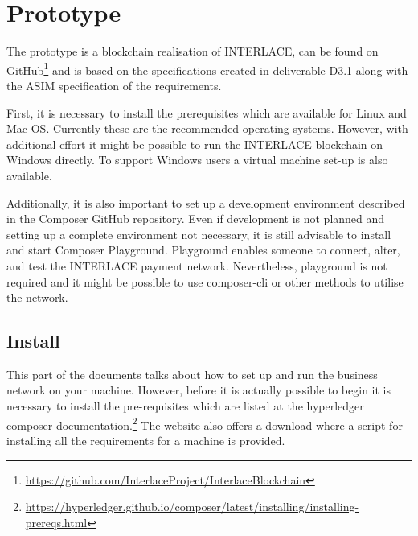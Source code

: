 

\section{Prototype}
\label{sec:prototype}

The prototype is a blockchain realisation of INTERLACE, can be found on GitHub\footnote{\url{https://github.com/InterlaceProject/InterlaceBlockchain}} and is based on the specifications created in deliverable D3.1 \cite{INTERLACE_D31} along with the ASIM specification of the requirements.

First, it is necessary to install the prerequisites which are available for Linux and Mac OS. Currently these are the recommended operating systems. However, with additional effort it might be possible to run the INTERLACE blockchain on Windows directly. To support Windows users a virtual machine set-up is also available.

Additionally, it is also important to set up a development environment described in the Composer GitHub repository. Even if development is not planned and setting up a complete environment not necessary, it is still advisable to install and start Composer Playground. Playground enables someone to connect, alter, and test the INTERLACE payment network. Nevertheless, playground is not required and it might be possible to use composer-cli or other methods to utilise the network.

\subsection{Install}

This part of the documents talks about how to set up and run the business network on your machine. However, before it is actually possible to begin it is necessary to install the pre-requisites which are listed at the hyperledger composer documentation.\footnote{\url{https://hyperledger.github.io/composer/latest/installing/installing-prereqs.html}} The website also offers a download where a script for installing all the requirements for a machine is provided.

